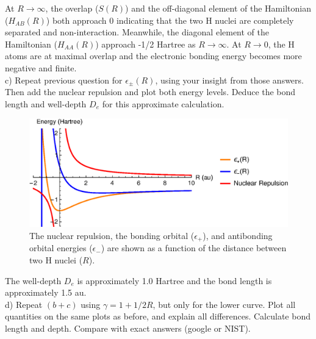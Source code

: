 \documentclass{article}
\begin{document}
{\color{blue}
  At $R\rightarrow \infty$, the overlap ($S(R)$) and the off-diagonal element of the
  Hamiltonian ($H_{AB}(R)$) both approach 0 indicating that the two H nuclei are completely
  separated and non-interaction. Meanwhile, the diagonal element of the Hamiltonian
  ($H_{AA}(R)$) approach -1/2 Hartree as $R\rightarrow\infty$. At $R\rightarrow 0$,
  the H atoms are at maximal overlap and the electronic bonding energy becomes more negative
  and finite.}
\\

\noindent c) Repeat previous question for $\epsilon_{\pm}(R)$, using your insight from
those answers. Then add the nuclear repulsion and plot both energy levels. Deduce the
bond length and well-depth $D_e$ for this approximate calculation.

\begin{figure}[H]
  \centering
  \includegraphics[scale=0.75]{h2_cat_curve.eps}
  \caption{The nuclear repulsion, the bonding orbital ($\epsilon_+$), and
    antibonding orbital energies ($\epsilon_-$) are shown as a function of
    the distance between two H nuclei ($R$).}
  \label{fig:cat_curve}
\end{figure}

{\color{blue}
  The well-depth $D_e$ is approximately 1.0 Hartree and the bond
  length is approximately 1.5 au.}
\\

\noindent d) Repeat $(b+c)$ using $\gamma = 1 + 1/2 R$, but only for the lower curve.
Plot all quantities on the same plots as before, and explain all differences. Calculate
bond length and depth. Compare with exact answers (google or NIST).
\end{document}
